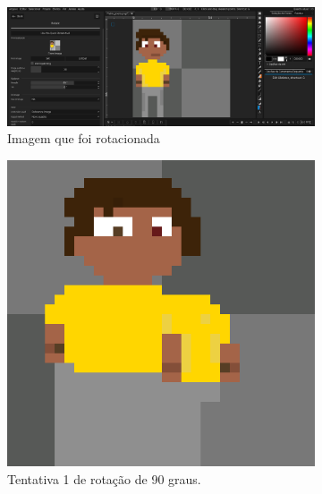 \begin{figure}[htbp]
    \centering
    \caption{\small Processo da utilização da ferramenta de rotação do PixelLab em junho/2025}
    \label{fig:pixelLabRotacao1}

    \begin{subfigure}{1\linewidth}
        \includegraphics[width=1\linewidth]{figs/pixelLab/dia1/tela.PNG}
        \caption{\small Imagem que foi rotacionada}
        \label{fig:pixelLabRot1a}
    \end{subfigure}
    \begin{subfigure}{0.35\linewidth}
        \includegraphics[width=1\linewidth]{figs/pixelLab/dia1/rotacao_1.PNG}
        \caption{\small Tentativa 1 de rotação de 90 graus.}
        \label{fig:pixelLabRot1b}
    \end{subfigure}
    \begin{subfigure}{0.35\linewidth}

\end{subfigure}
\end{figure}
